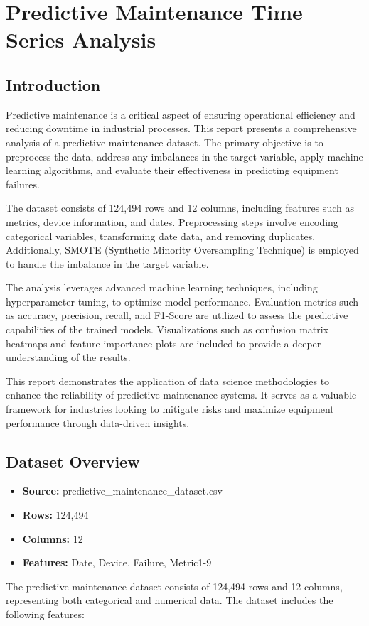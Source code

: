 \chapter{Predictive Maintenance Time Series Analysis}
	
	\section{Introduction}
	Predictive maintenance is a critical aspect of ensuring operational efficiency and reducing downtime in industrial processes. This report presents a comprehensive analysis of a predictive maintenance dataset. The primary objective is to preprocess the data, address any imbalances in the target variable, apply machine learning algorithms, and evaluate their effectiveness in predicting equipment failures.
	
	The dataset consists of 124,494 rows and 12 columns, including features such as metrics, device information, and dates. Preprocessing steps involve encoding categorical variables, transforming date data, and removing duplicates. Additionally, SMOTE (Synthetic Minority Oversampling Technique) is employed to handle the imbalance in the target variable.
	
	The analysis leverages advanced machine learning techniques, including hyperparameter tuning, to optimize model performance. Evaluation metrics such as accuracy, precision, recall, and F1-Score are utilized to assess the predictive capabilities of the trained models. Visualizations such as confusion matrix heatmaps and feature importance plots are included to provide a deeper understanding of the results.
	
	This report demonstrates the application of data science methodologies to enhance the reliability of predictive maintenance systems. It serves as a valuable framework for industries looking to mitigate risks and maximize equipment performance through data-driven insights.
	
	\section{Dataset Overview}
	\begin{itemize}
		\item \textbf{Source:} predictive\_maintenance\_dataset.csv
		\item \textbf{Rows:} 124,494
		\item \textbf{Columns:} 12
		\item \textbf{Features:} Date, Device, Failure, Metric1-9
	\end{itemize}
	The predictive maintenance dataset consists of 124,494 rows and 12 columns, representing both categorical and numerical data. The dataset includes the following features:
	
